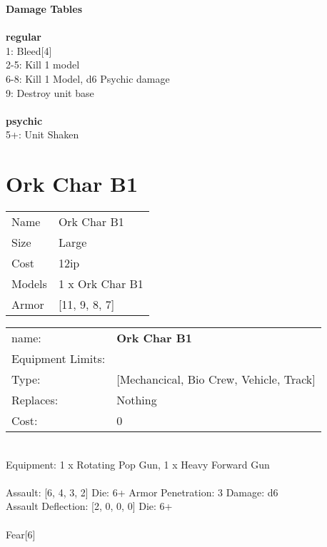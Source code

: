 {\bf Damage Tables} \\
\ \\ {\bf regular } \\
1: Bleed[4] \\
2-5: Kill 1 model \\
6-8: Kill 1 Model, d6 Psychic damage \\
9: Destroy unit base \\
\ \\ {\bf psychic } \\
5+: Unit Shaken \\










\pagebreak\pagebreak

\section{ Ork Char B1 }

\begin{tabular}{ll}
  Name & Ork Char B1 \\
  Size & Large\\
  Cost & 12ip\\
  Models & 1 x Ork Char B1\\
  Armor & [11, 9, 8, 7]\\
\end{tabular}

\noindent 

\noindent
\begin{tabular}{ll}
name: &{\bf Ork Char B1 } \\
Equipment Limits: & \\
Type: &[Mechancical, Bio Crew, Vehicle, Track] \\
Replaces: &Nothing \\
Cost: & 0\\
\end{tabular}
\ \\
Equipment: 1 x Rotating Pop Gun, 1 x Heavy Forward Gun \\
\ \\
Assault: [6, 4, 3, 2] Die: 6+ Armor Penetration: 3 Damage: d6 \\
Assault Deflection: [2, 0, 0, 0] Die: 6+\\
\\ 
Fear[6]\\ 
 
